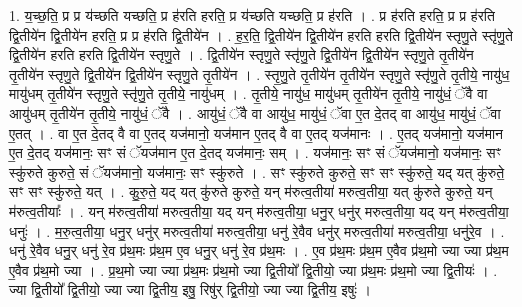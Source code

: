 \documentclass[17pt]{extarticle}
\begin{document}
1. य॒च्छ॒ति॒ प्र प्र य॑च्छति यच्छति॒ प्र ह॑रति हरति॒ प्र य॑च्छति यच्छति॒ प्र ह॑रति । . प्र ह॑रति हरति॒ प्र प्र ह॑रति द्वि॒तीये॑न द्वि॒तीये॑न हरति॒ प्र प्र ह॑रति द्वि॒तीये॑न । . ह॒र॒ति॒ द्वि॒तीये॑न द्वि॒तीये॑न हरति हरति द्वि॒तीये॑न स्तृणु॒ते स्तृ॑णु॒ते द्वि॒तीये॑न हरति हरति द्वि॒तीये॑न स्तृणु॒ते । . द्वि॒तीये॑न स्तृणु॒ते स्तृ॑णु॒ते द्वि॒तीये॑न द्वि॒तीये॑न स्तृणु॒ते तृ॒तीये॑न तृ॒तीये॑न स्तृणु॒ते द्वि॒तीये॑न द्वि॒तीये॑न स्तृणु॒ते तृ॒तीये॑न । . स्तृ॒णु॒ते तृ॒तीये॑न तृ॒तीये॑न स्तृणु॒ते स्तृ॑णु॒ते तृ॒तीये॒ नायु॑ध॒ मायु॑धम् तृ॒तीये॑न स्तृणु॒ते स्तृ॑णु॒ते तृ॒तीये॒ नायु॑धम् । . तृ॒तीये॒ नायु॑ध॒ मायु॑धम् तृ॒तीये॑न तृ॒तीये॒ नायु॑धं॒ ॅवै वा आयु॑धम् तृ॒तीये॑न तृ॒तीये॒ नायु॑धं॒ ॅवै । . आयु॑धं॒ ॅवै वा आयु॑ध॒ मायु॑धं॒ ॅवा ए॒त दे॒तद् वा आयु॑ध॒ मायु॑धं॒ ॅवा ए॒तत् । . वा ए॒त दे॒तद् वै वा ए॒तद् यज॑मानो॒ यज॑मान ए॒तद् वै वा ए॒तद् यज॑मानः । . ए॒तद् यज॑मानो॒ यज॑मान ए॒त दे॒तद् यज॑मानः॒ सꣳ सं ॅयज॑मान ए॒त दे॒तद् यज॑मानः॒ सम् । . यज॑मानः॒ सꣳ सं ॅयज॑मानो॒ यज॑मानः॒ सꣳ स्कु॑रुते कुरुते॒ सं ॅयज॑मानो॒ यज॑मानः॒ 
सꣳ स्कु॑रुते । . सꣳ स्कु॑रुते कुरुते॒ सꣳ सꣳ स्कु॑रुते॒ यद् यत् कु॑रुते॒ सꣳ सꣳ स्कु॑रुते॒ यत् । . कु॒रु॒ते॒ यद् यत् कु॑रुते कुरुते॒ यन् म॑रुत्व॒तीया॑ मरुत्व॒तीया॒ यत् कु॑रुते कुरुते॒ यन् म॑रुत्व॒तीयाः᳚ । . यन् म॑रुत्व॒तीया॑ मरुत्व॒तीया॒ यद् यन् म॑रुत्व॒तीया॒ धनु॒र् धनु॑र् मरुत्व॒तीया॒ यद् यन् म॑रुत्व॒तीया॒ धनुः॑ । . म॒रु॒त्व॒तीया॒ धनु॒र् धनु॑र् मरुत्व॒तीया॑ मरुत्व॒तीया॒ धनु॑ रे॒वैव धनु॑र् मरुत्व॒तीया॑ मरुत्व॒तीया॒ धनु॑रे॒व । . धनु॑ रे॒वैव धनु॒र् धनु॑ रे॒व प्र॑थ॒मः प्र॑थ॒म ए॒व धनु॒र् धनु॑ रे॒व प्र॑थ॒मः । . ए॒व प्र॑थ॒मः प्र॑थ॒म ए॒वैव प्र॑थ॒मो ज्या ज्या प्र॑थ॒म ए॒वैव प्र॑थ॒मो ज्या । . प्र॒थ॒मो ज्या ज्या प्र॑थ॒मः प्र॑थ॒मो ज्या द्वि॒तीयो᳚ द्वि॒तीयो॒ ज्या प्र॑थ॒मः प्र॑थ॒मो ज्या द्वि॒तीयः॑ । . ज्या द्वि॒तीयो᳚ द्वि॒तीयो॒ ज्या ज्या द्वि॒तीय॒ इषु॒ रिषु॑र् द्वि॒तीयो॒ ज्या ज्या द्वि॒तीय॒ इषुः॑ । \newline
\end{document}
